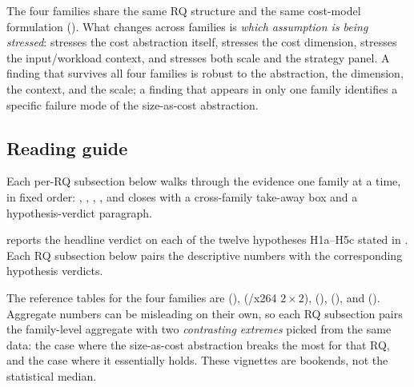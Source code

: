 The four families share the same RQ structure and the same cost-model
formulation (). What changes across families is
\emph{which assumption is being stressed}: \StudyReplication stresses the cost
abstraction itself, \StudyEnergy stresses the cost dimension, \StudyWorkload
stresses the input/workload context, and \StudyLinux stresses both scale and
the strategy panel. A finding that survives all four families is robust to the
abstraction, the dimension, the context, and the scale; a finding that
appears in only one family identifies a specific failure mode of the
size-as-cost abstraction.

\subsection{Reading guide}
\label{subsec:reading-guide}

Each per-RQ subsection below walks through the evidence one family at
a time, in fixed order: \StudyReplication, \StudyEnergy, \StudyWorkload, \StudyLinux, and
closes with a cross-family take-away box and a hypothesis-verdict
paragraph. 

 reports the headline verdict on each of
the twelve hypotheses H1a--H5c stated in . Each
RQ subsection below pairs the descriptive numbers with the corresponding
hypothesis verdicts.



The reference tables for the four families are
 (\StudyReplication),
 (\StudyReplication/x264 $2\!\times\!2$),
 (\StudyEnergy),
 (\dsWLI), and
 (\StudyLinux). Aggregate numbers can be misleading
on their own, so each RQ subsection pairs the family-level aggregate
with two \emph{contrasting extremes} picked from the same data: the
case where the size-as-cost abstraction breaks the most for that RQ,
and the case where it essentially holds. These vignettes are bookends,
not the statistical median.

